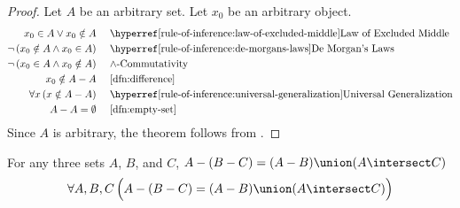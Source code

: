 \begin{proof}
    Let \( A \) be an arbitrary set. Let \( x_{0} \) be an arbitrary object.
    \begin{equation*}
        \begin{aligned}
            x_{0} \in A \lor x_{0} \notin A& \\
            \lnot \, \mleft( x_{0} \notin A \land x_{0} \in A \mright)& \\
            \lnot \, \mleft( x_{0} \in A \land x_{0} \notin A \mright)& \\
            x_{0} \notin A - A& \\
            \forall x \, \mleft( x \notin A - A \mright)& \\
            A - A = \emptyset&
        \end{aligned}
        \text{  }
        \begin{aligned}
            &\quad \text{\aref{rule-of-inference:law-of-excluded-middle}{Law of Excluded Middle}}\\
            &\quad \text{\aref{rule-of-inference:de-morgans-laws}{De Morgan's Laws}}\\
            &\quad \text{\( \land \)-Commutativity}\\
            &\quad \text{\cref{dfn:difference}}\\
            &\quad \text{\aref{rule-of-inference:universal-generalization}{Universal Generalization}}\\
            &\quad \text{\cref{dfn:empty-set}}
        \end{aligned}
    \end{equation*}
    Since \( A \) is arbitrary, the theorem follows from .
\end{proof}

\begin{thm}
    \label{set-identities:subtract-B-minus-C-from-A}
    For any three sets \( A \), \( B \), and \( C \),
    \( A - \mleft( B - C \mright) = \mleft( A - B \mright) \union \mleft( A \intersect C \mright) \)
    \begin{equation*}
        \forall A,B,C \, \Big( A - \mleft( B - C \mright) = \mleft( A - B \mright) \union \mleft( A \intersect C \mright)  \Big)
    \end{equation*}
\end{thm}

